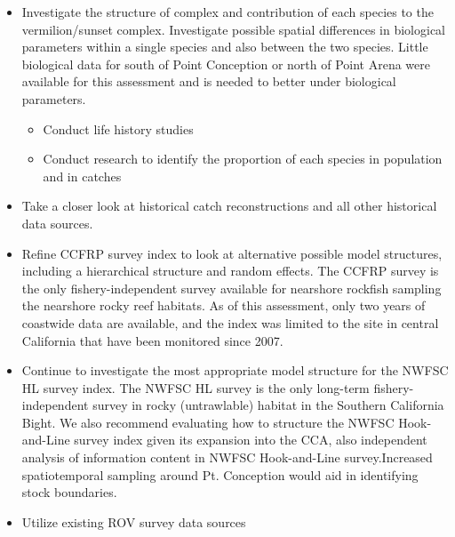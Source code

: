 \documentclass[
  english,
  a4paper,
]{article}
\providecommand{\tightlist}{%
  \setlength{\itemsep}{0pt}\setlength{\parskip}{0pt}}
\begin{document}
\begin{itemize}
\item
  Investigate the structure of complex and contribution of each species to the
  vermilion/sunset complex. Investigate possible spatial differences in biological parameters within
  a single species and also between the two species. Little biological data for south of
  Point Conception or north of Point Arena were available for this assessment and is needed
  to better under biological parameters.

  \begin{itemize}
  \tightlist
  \item
    Conduct life history studies
  \item
    Conduct research to identify the proportion of each species in population and in catches
  \end{itemize}
\item
  Take a closer look at historical catch reconstructions and
  all other historical data sources.
\item
  Refine CCFRP survey index to look at alternative possible model structures, including
  a hierarchical structure and random effects. The CCFRP survey is the only
  fishery-independent survey available for nearshore rockfish sampling the nearshore rocky
  reef habitats. As of this assessment, only two years of coastwide data are available,
  and the index was limited to the site in central California that have been monitored
  since 2007.
\item
  Continue to investigate the most appropriate model structure for the NWFSC HL survey index.
  The NWFSC HL survey is the only long-term fishery-independent survey in rocky (untrawlable) habitat
  in the Southern California Bight. We also recommend evaluating how to structure the NWFSC Hook-and-Line survey index given its expansion into the CCA, also independent analysis of information content in NWFSC Hook-and-Line survey.Increased spatiotemporal sampling around Pt. Conception would aid in identifying stock boundaries.
\item
  Utilize existing ROV survey data sources


\end{itemize}
\end{document}
